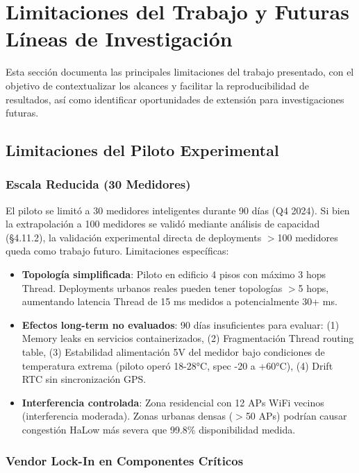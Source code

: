 ﻿\section{Limitaciones del Trabajo y Futuras Líneas de Investigación}

Esta sección documenta las principales limitaciones del trabajo presentado, con el objetivo de contextualizar los alcances y facilitar la reproducibilidad de resultados, así como identificar oportunidades de extensión para investigaciones futuras.

\subsection{Limitaciones del Piloto Experimental}

\subsubsection{Escala Reducida (30 Medidores)}

El piloto se limitó a 30 medidores inteligentes durante 90 días (Q4 2024). Si bien la extrapolación a 100 medidores se validó mediante análisis de capacidad (§4.11.2), la validación experimental directa de deployments $>$100 medidores queda como trabajo futuro. Limitaciones específicas:

\begin{itemize}
    \item \textbf{Topología simplificada}: Piloto en edificio 4 pisos con máximo 3 hops Thread. Deployments urbanos reales pueden tener topologías $>$5 hops, aumentando latencia Thread de 15 ms medidos a potencialmente 30+ ms.
    
    \item \textbf{Efectos long-term no evaluados}: 90 días insuficientes para evaluar: (1) Memory leaks en servicios containerizados, (2) Fragmentación Thread routing table, (3) Estabilidad alimentación 5V del medidor bajo condiciones de temperatura extrema (piloto operó 18-28°C, spec -20 a +60°C), (4) Drift RTC sin sincronización GPS.
    
    \item \textbf{Interferencia controlada}: Zona residencial con 12 APs WiFi vecinos (interferencia moderada). Zonas urbanas densas ($>$50 APs) podrían causar congestión HaLow más severa que 99.8\% disponibilidad medida.
\end{itemize}

\subsubsection{Vendor Lock-In en Componentes Críticos}

